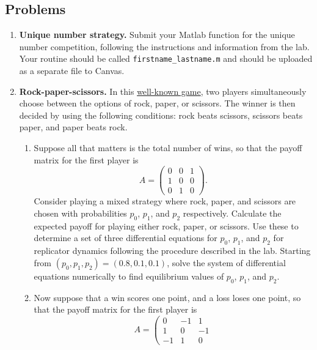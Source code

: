 \documentclass[12pt]{article}
\begin{document}
\subsection*{Problems}
\begin{enumerate}
 \item \textbf{Unique number strategy.} Submit your Matlab function for the unique
    number competition, following the instructions and information from the
    lab. Your routine should be called \texttt{firstname\_lastname.m} and
    should be uploaded as a separate file to Canvas.
  \item \textbf{Rock-paper-scissors.} In this
    \href{http://en.wikipedia.org/wiki/Rock-paper-scissors}{well-known game},
    two players simultaneously choose between the options of rock, paper, or
    scissors. The winner is then decided by using the following conditions:
    rock beats scissors, scissors beats paper, and paper beats rock.
    \begin{enumerate}
      \item Suppose all that matters is the total number of wins, so that the
	payoff matrix for the first player is
	\begin{equation}
	  A=\left(
	  \begin{array}{ccc}
	    0 & 0 & 1 \\
	    1 & 0 & 0 \\
	    0 & 1 & 0
	  \end{array}	  
	  \right).
	  \label{eq:rps1}
	\end{equation}
	Consider playing a mixed strategy where rock, paper, and scissors are
	chosen with probabilities $p_0$, $p_1$, and $p_2$ respectively. Calculate
	the expected payoff for playing either rock, paper, or scissors. Use
	these to determine a set of three differential equations for $p_0$, $p_1$,
	and $p_2$ for replicator dynamics following the procedure described in
	the lab. Starting from $(p_0,p_1,p_2)=(0.8,0.1,0.1)$, solve the system
	of differential equations numerically to find equilibrium values of
	$p_0$, $p_1$, and $p_2$.
      \item Now suppose that a win scores one point, and a loss loses one
	point, so that the payoff matrix for the first player is
	\begin{equation}
	  A=\left(
	  \begin{array}{ccc}
	    0 & -1 & 1 \\
	    1 & 0 & -1 \\
	    -1 & 1 & 0
	  \end{array}

\end{equation}
\end{enumerate}
\end{enumerate}
\end{document}
